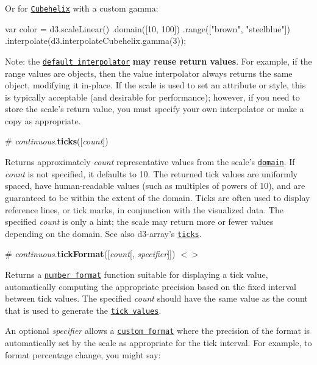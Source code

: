 Or for \href{https://github.com/d3/d3-interpolate#interpolateCubehelix}{\tt Cubehelix} with a custom gamma\+:


\begin{DoxyCode}
var color = d3.scaleLinear()
    .domain([10, 100])
    .range(["brown", "steelblue"])
    .interpolate(d3.interpolateCubehelix.gamma(3));
\end{DoxyCode}


Note\+: the \href{https://github.com/d3/d3-interpolate#interpolate}{\tt default interpolator} {\bfseries may reuse return values}. For example, if the range values are objects, then the value interpolator always returns the same object, modifying it in-\/place. If the scale is used to set an attribute or style, this is typically acceptable (and desirable for performance); however, if you need to store the scale’s return value, you must specify your own interpolator or make a copy as appropriate.

\label{_continuous_ticks}%
\# {\itshape continuous}.{\bfseries ticks}(\mbox{[}{\itshape count}\mbox{]})

Returns approximately {\itshape count} representative values from the scale’s \href{#continuous_domain}{\tt domain}. If {\itshape count} is not specified, it defaults to 10. The returned tick values are uniformly spaced, have human-\/readable values (such as multiples of powers of 10), and are guaranteed to be within the extent of the domain. Ticks are often used to display reference lines, or tick marks, in conjunction with the visualized data. The specified {\itshape count} is only a hint; the scale may return more or fewer values depending on the domain. See also d3-\/array’s \href{https://github.com/d3/d3-array#ticks}{\tt ticks}.

\label{_continuous_tickFormat}%
\# {\itshape continuous}.{\bfseries tick\+Format}(\mbox{[}{\itshape count}\mbox{[}, {\itshape specifier}\mbox{]}\mbox{]}) \href{https://github.com/d3/d3-scale/blob/master/src/tickFormat.js}{\tt $<$$>$}

Returns a \href{https://github.com/d3/d3-format}{\tt number format} function suitable for displaying a tick value, automatically computing the appropriate precision based on the fixed interval between tick values. The specified {\itshape count} should have the same value as the count that is used to generate the \href{#continuous_ticks}{\tt tick values}.

An optional {\itshape specifier} allows a \href{https://github.com/d3/d3-format#locale_format}{\tt custom format} where the precision of the format is automatically set by the scale as appropriate for the tick interval. For example, to format percentage change, you might say\+:


